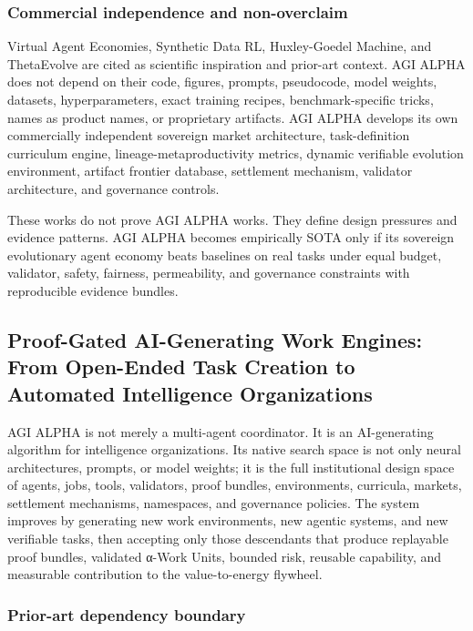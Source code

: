 \subsubsection{Commercial independence and
non-overclaim}\label{commercial-independence-and-non-overclaim}

Virtual Agent Economies, Synthetic Data RL, Huxley-Goedel Machine, and
ThetaEvolve are cited as scientific inspiration and prior-art context.
AGI ALPHA does not depend on their code, figures, prompts, pseudocode,
model weights, datasets, hyperparameters, exact training recipes,
benchmark-specific tricks, names as product names, or proprietary
artifacts. AGI ALPHA develops its own commercially independent sovereign
market architecture, task-definition curriculum engine,
lineage-metaproductivity metrics, dynamic verifiable evolution
environment, artifact frontier database, settlement mechanism, validator
architecture, and governance controls.

These works do not prove AGI ALPHA works. They define design pressures
and evidence patterns. AGI ALPHA becomes empirically SOTA only if its
sovereign evolutionary agent economy beats baselines on real tasks under
equal budget, validator, safety, fairness, permeability, and governance
constraints with reproducible evidence bundles.

\subsection{Proof-Gated AI-Generating Work Engines: From Open-Ended Task
Creation to Automated Intelligence
Organizations}\label{proof-gated-ai-generating-work-engines-from-open-ended-task-creation-to-automated-intelligence-organizations}

AGI ALPHA is not merely a multi-agent coordinator. It is an
AI-generating algorithm for intelligence organizations. Its native
search space is not only neural architectures, prompts, or model
weights; it is the full institutional design space of agents, jobs,
tools, validators, proof bundles, environments, curricula, markets,
settlement mechanisms, namespaces, and governance policies. The system
improves by generating new work environments, new agentic systems, and
new verifiable tasks, then accepting only those descendants that produce
replayable proof bundles, validated α-Work Units, bounded risk, reusable
capability, and measurable contribution to the value-to-energy flywheel.

\subsubsection{Prior-art dependency
boundary}\label{prior-art-dependency-boundary-1}

